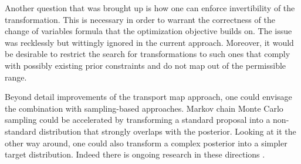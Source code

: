 \par %
Another question that was brought up is how one can enforce invertibility of the transformation.
This is necessary in order to warrant the correctness of the change of variables formula that the optimization objective builds on.
The issue was recklessly but wittingly ignored in the current approach.
Moreover, it would be desirable to restrict the search for transformations to such ones that comply with possibly existing prior constraints and do not map out of the permissible range.
\par %
Beyond detail improvements of the transport map approach, one could envisage the combination with sampling-based approaches.
Markov chain Monte Carlo sampling could be accelerated by transforming a standard proposal into a non-standard distribution that strongly overlaps with the posterior.
Looking at it the other way around, one could also transform a complex posterior into a simpler target distribution.
Indeed there is ongoing research in these directions \cite{Mapping:Parno2014:arXiv,Mapping:Parno2015:PhD}.